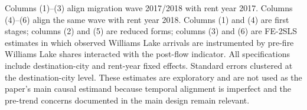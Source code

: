 \begin{table}[htbp]
   \par \raggedright 
   Columns (1)--(3) align migration wave 2017/2018 with rent year 2017. Columns (4)--(6) align the same wave with rent year 2018. Columns (1) and (4) are first stages; columns (2) and (5) are reduced forms; columns (3) and (6) are FE-2SLS estimates in which observed Williams Lake arrivals are instrumented by pre-fire Williams Lake shares interacted with the post-flow indicator. All specifications include destination-city and rent-year fixed effects. Standard errors clustered at the destination-city level. These estimates are exploratory and are not used as the paper's main causal estimand because temporal alignment is imperfect and the pre-trend concerns documented in the main design remain relevant.
\end{table}
